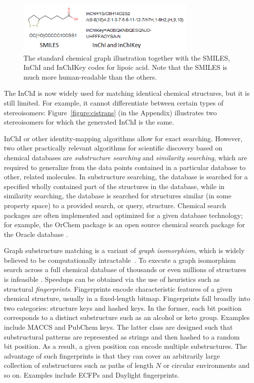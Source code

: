 \documentclass{sig-alternate}
\begin{document}
\begin{figure}
\centering
\includegraphics[height=1in]{lipoicacid.png}
\caption{The standard chemical graph illustration together with the
  SMILES, InChI and InChIKey codes for lipoic acid. Note that the
  SMILES is much more human-readable than the others.}
\label{figure:smiles}
\end{figure}

The InChI is now widely used for matching identical chemical
structures, but it is still limited. For example, it cannot
differentiate between certain types of stereoisomers:
Figure~\ref{figure:cistrans} (in the Appendix) illustrates two
stereoisomers for which the generated InChI is the same.

InChI or other identity-mapping algorithms allow for exact
searching. However, two other practically relevant algorithms for
scientific discovery based on chemical databases are
\emph{substructure searching} and \emph{similarity searching}, which
are required to generalize from the data points contained in a
particular database to other, related molecules. In substructure
searching, the database is searched for a specified wholly contained
part of the structures in the database, while in similarity searching,
the database is searched for structures similar (in some property
space) to a provided search, or query, structure. Chemical search
packages are often implemented and optimized for a given database
technology; for example, the OrChem package is an open source chemical
search package for the Oracle database \cite{rijnbeek2009}.

Graph substructure matching is a variant of \emph{graph isomorphism},
which is widely believed to be computationally
intractable~\cite{cordella2001}. To execute a graph isomorphism search
across a full chemical database of thousands or even millions of
structures is infeasible \cite{Weininger:2011ly}. Speedups can be
obtained via the use of heuristics such as structural
\emph{fingerprints}. Fingerprints encode characteristic features of a
given chemical structure, usually in a fixed-length
bitmap. Fingerprints fall broadly into two categories: structure keys
and hashed keys. In the former, each bit position corresponds to a
distinct substructure such as an alcohol or keto group. Examples
include MACCS and PubChem keys. The latter class are designed such
that substructural patterns are represented as strings and then hashed
to a random bit position. As a result, a given position can encode
multiple substructures. The advantage of such fingerprints is that
they can cover an arbitrarily large collection of substructures such
as paths of length $N$ or circular environments and so on. Examples
include ECFPs and Daylight fingerprints.
\end{document}
